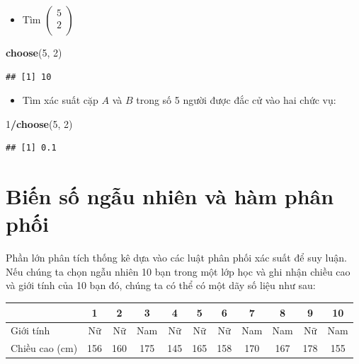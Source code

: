\documentclass[
]{book}
\newenvironment{Shaded}{\begin{snugshade}}{\end{snugshade}}
\newcommand{\DecValTok}[1]{\textcolor[rgb]{0.00,0.00,0.81}{#1}}
\newcommand{\KeywordTok}[1]{\textcolor[rgb]{0.13,0.29,0.53}{\textbf{#1}}}
\newcommand{\NormalTok}[1]{#1}
\newcommand{\OperatorTok}[1]{\textcolor[rgb]{0.81,0.36,0.00}{\textbf{#1}}}
\providecommand{\tightlist}{%
  \setlength{\itemsep}{0pt}\setlength{\parskip}{0pt}}
\begin{document}
\begin{itemize}
\tightlist
\item
  Tìm \(\begin{pmatrix} 5 \\ 2 \\ \end{pmatrix}\)
\end{itemize}

\begin{Shaded}
\begin{Highlighting}[]
\KeywordTok{choose}\NormalTok{(}\DecValTok{5}\NormalTok{, }\DecValTok{2}\NormalTok{)}
\end{Highlighting}
\end{Shaded}

\begin{verbatim}
## [1] 10
\end{verbatim}

\begin{itemize}
\tightlist
\item
  Tìm xác suất cặp \(A\) và \(B\) trong số 5 người được đắc cử vào hai chức vụ:
\end{itemize}

\begin{Shaded}
\begin{Highlighting}[]
\DecValTok{1}\OperatorTok{/}\KeywordTok{choose}\NormalTok{(}\DecValTok{5}\NormalTok{, }\DecValTok{2}\NormalTok{)}
\end{Highlighting}
\end{Shaded}

\begin{verbatim}
## [1] 0.1
\end{verbatim}

\hypertarget{biux1ebfn-sux1ed1-ngux1eabu-nhiuxean-vuxe0-huxe0m-phuxe2n-phux1ed1i}{%
\section{Biến số ngẫu nhiên và hàm phân phối}\label{biux1ebfn-sux1ed1-ngux1eabu-nhiuxean-vuxe0-huxe0m-phuxe2n-phux1ed1i}}

Phần lớn phân tích thống kê dựa vào các luật phân phối xác suất để suy luận. Nếu chúng ta chọn ngẫu nhiên 10 bạn trong một lớp học và ghi nhận chiều cao và giới tính của 10 bạn đó, chúng ta có thể có một dãy số liệu như sau:

\begin{longtable}[]{@{}lcccccccccc@{}}
\toprule
& 1 & 2 & 3 & 4 & 5 & 6 & 7 & 8 & 9 & 10\tabularnewline
\midrule
\endhead
Giới tính & Nữ & Nữ & Nam & Nữ & Nữ & Nữ & Nam & Nam & Nữ & Nam\tabularnewline
Chiều cao (cm) & 156 & 160 & 175 & 145 & 165 & 158 & 170 & 167 & 178 & 155\tabularnewline
\bottomrule
\end{longtable}
\end{document}
